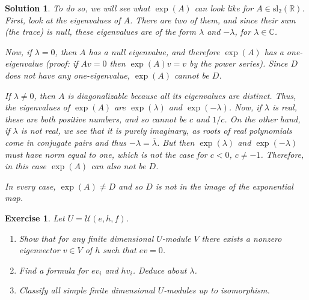 \documentclass{article}
\newtheorem{ex}{Exercise}
\theoremstyle{nonumberplain}
\newtheorem{sol}{Solution}
\newcommand{\R}{\mathbb{R}}
\newcommand{\C}{\mathbb{C}}
\newcommand{\conj}[1]{\overline{#1}}
\newcommand{\la}[1]{\mathrm{#1}}
\begin{document}
\begin{sol}
To do so, we will see what $\exp(A)$ can look like for $A \in \la{sl}_2(\R)$. First, look at the eigenvalues of $A$. There are two of them, and since their sum (the trace) is null, these eigenvalues are of the form $\lambda$ and $-\lambda$, for $\lambda \in \C$.

Now, if $\lambda = 0$, then $A$ has a null eigenvalue, and therefore $\exp(A)$ has a one-eigenvalue (proof: if $Av=0$ then $\exp(A)v = v$ by the power series). Since $D$ does not have any one-eigenvalue, $\exp(A)$ cannot be $D$.

If $\lambda \neq 0$, then $A$ is diagonalizable because all its eigenvalues are distinct. Thus, the eigenvalues of $\exp(A)$ are $\exp(\lambda)$ and $\exp(-\lambda)$. Now, if $\lambda$ is real, these are both positive numbers, and so cannot be $c$ and $1/c$. On the other hand, if $\lambda$ is not real, we see that it is purely imaginary, as roots of real polynomials come in conjugate pairs and thus $-\lambda = \conj \lambda$. But then $\exp(\lambda)$ and $\exp(-\lambda)$ must have norm equal to one, which is not the case for $c < 0$, $c \neq -1$. Therefore, in this case $\exp(A)$ can also not be $D$.

In every case, $\exp(A) \neq D$ and so $D$ is not in the image of the exponential map.
\end{sol}

\setcounter{ex}{3}

\begin{ex}
Let $U = \mathcal{U}(e,h,f)$.
\begin{enumerate}
\item Show that for any finite dimensional $U$-module $V$ there exists a nonzero eigenvector $v \in V$ of $h$ such that $ev=0$.
\item Find a formula for $e v_i$ and $h v_i$. Deduce about $\lambda$.
\item Classify all simple finite dimensional $U$-modules up to isomorphism.
\end{enumerate}
\end{ex}
\end{document}

